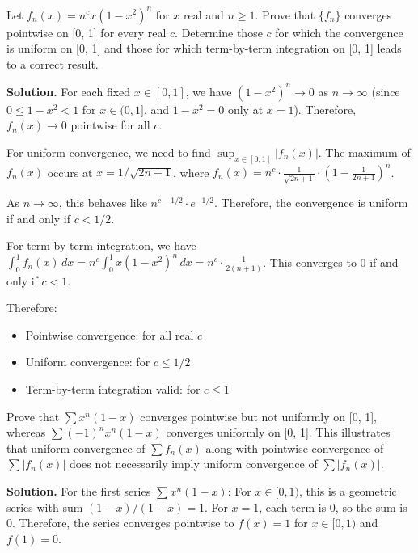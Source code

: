 \begin{problembox}
Let \( f_n(x) = n^c x(1 - x^2)^n \) for \( x \) real and \( n \geq 1 \). Prove that \( \{f_n\} \) converges pointwise on [0, 1] for every real \( c \). Determine those \( c \) for which the convergence is uniform on [0, 1] and those for which term-by-term integration on [0, 1] leads to a correct result.
\end{problembox}

\noindent\textbf{Solution.} For each fixed \( x \in [0, 1] \), we have \( (1 - x^2)^n \to 0 \) as \( n \to \infty \) (since \( 0 \leq 1 - x^2 < 1 \) for \( x \in (0, 1] \), and \( 1 - x^2 = 0 \) only at \( x = 1 \)). Therefore, \( f_n(x) \to 0 \) pointwise for all \( c \).

For uniform convergence, we need to find \( \sup_{x \in [0,1]} |f_n(x)| \). The maximum of \( f_n(x) \) occurs at \( x = 1/\sqrt{2n + 1} \), where \( f_n(x) = n^c \cdot \frac{1}{\sqrt{2n + 1}} \cdot \left(1 - \frac{1}{2n + 1}\right)^n \).

As \( n \to \infty \), this behaves like \( n^{c - 1/2} \cdot e^{-1/2} \). Therefore, the convergence is uniform if and only if \( c < 1/2 \).

For term-by-term integration, we have \( \int_0^1 f_n(x) \, dx = n^c \int_0^1 x(1 - x^2)^n \, dx = n^c \cdot \frac{1}{2(n + 1)} \). This converges to 0 if and only if \( c < 1 \).

Therefore:
\begin{itemize}
\item Pointwise convergence: for all real \( c \)
\item Uniform convergence: for \( c \le 1/2 \)
\item Term-by-term integration valid: for \( c \le 1 \)
\end{itemize}


\begin{problembox}
Prove that \( \sum x^n (1 - x) \) converges pointwise but not uniformly on [0, 1], whereas \( \sum (-1)^n x^n (1 - x) \) converges uniformly on [0, 1]. This illustrates that uniform convergence of \( \sum f_n(x) \) along with pointwise convergence of \( \sum |f_n(x)| \) does not necessarily imply uniform convergence of \( \sum |f_n(x)| \).
\end{problembox}

\noindent\textbf{Solution.} For the first series \( \sum x^n (1 - x) \): For \( x \in [0, 1) \), this is a geometric series with sum \( (1 - x)/(1 - x) = 1 \). For \( x = 1 \), each term is 0, so the sum is 0. Therefore, the series converges pointwise to \( f(x) = 1 \) for \( x \in [0, 1) \) and \( f(1) = 0 \).

